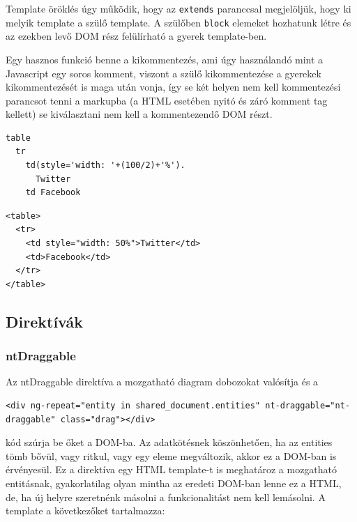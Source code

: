 Template öröklés úgy működik, hogy az \lstinline{extends} paranccsal megjelöljük, hogy ki melyik template a szülő template. A szülőben \lstinline{block} elemeket hozhatunk létre és az ezekben levő DOM rész felülírható a gyerek template-ben. 

Egy hasznos funkció benne a kikommentezés, ami úgy használandó mint a Javascript egy soros komment, viszont a szülő kikommentezése a gyerekek kikommentezését is maga után vonja, így se két helyen nem kell kommentezési parancsot tenni a markupba (a HTML esetében nyitó és záró komment tag kellett) se kiválasztani nem kell a kommentezendő DOM részt.

\begin{lstlisting}[caption=Példa Jade markup]
table
  tr
    td(style='width: '+(100/2)+'%').
      Twitter
    td Facebook
\end{lstlisting}

\begin{lstlisting}[caption=Az ekvivalens HTML]
<table>
  <tr>
    <td style="width: 50%">Twitter</td>
    <td>Facebook</td>
  </tr>
</table>
\end{lstlisting}

\subsection{Direktívák}

\subsubsection{ntDraggable}

Az ntDraggable direktíva a mozgatható diagram dobozokat valósítja és a 

\begin{lstlisting}
<div ng-repeat="entity in shared_document.entities" nt-draggable="nt-draggable" class="drag"></div>
\end{lstlisting}


kód szúrja be őket a DOM-ba. Az adatkötésnek köszönhetően, ha az entities tömb bővül, vagy ritkul, vagy egy eleme megváltozik, akkor ez a DOM-ban is érvényesül. Ez a direktíva egy HTML template-t is meghatároz a mozgatható entitásnak, gyakorlatilag olyan mintha az eredeti DOM-ban lenne ez a HTML, de, ha új helyre szeretnénk másolni a funkcionalitást nem kell lemásolni. A template a következőket tartalmazza:

